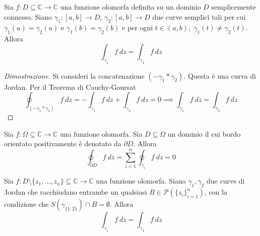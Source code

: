             \begin{corollary}
                Sia $f: D \subseteq \mathbb{C} \rightarrow \mathbb{C}$ una funzione olomorfa definita su un dominio $D$ semplicemente connesso.
                Siano $\gamma_{1}: [a, b] \rightarrow D$, $\gamma_{2}: [a, b] \rightarrow D$ due curve semplici tali per cui $\gamma_{1}(a) = \gamma_{2}(a)$ e $\gamma_{1}(b) = \gamma_{2}(b)$ e per ogni $t \in (a, b), \; \gamma_{1}(t) \neq \gamma_{2}(t)$.
                Allora
                \[
                    \int_{\gamma_{1}} f \: dz = \int_{\gamma_{2}} f \: dz
                \]
            \end{corollary}

            \begin{proof}[Dimostrazione]
                Si consideri la concatenazione $(-\gamma_{1} * \gamma_{2})$.
                Questa è una curva di Jordan.
                Per il Teorema di Cauchy-Goursat
                \[
                    \oint_{(-\gamma_{1} * \gamma_{2})} f \: dz = - \int_{\gamma_{1}} f \: dz + \int_{\gamma_{2}} f \: dz = 0 \implies \int_{\gamma_{1}} f \: dz = \int_{\gamma_{2}} f \: dz
                \]
            \end{proof}

            \begin{theorem}
                Sia $f: \Omega \subseteq \mathbb{C} \rightarrow \mathbb{C}$ una funzione olomorfa.
                Sia $D \subseteq \Omega$ un dominio il cui bordo orientato positivamente è denotato da $\partial D$.
                Allora
                \[
                    \oint_{\partial D} f \: dz = \sum_{i = 1}^{n} \oint_{\gamma_{i}} f \: dz = 0
                \]
            \end{theorem}

            \begin{corollary}
                Sia $f: D \setminus \{z_{1}, ..., z_{n}\} \subseteq \mathbb{C} \rightarrow \mathbb{C}$ una funzione olomorfa.
                Siano $\gamma_{1}, \gamma_{2}$ due curve di Jordan che racchiudano entrambe un qualsiasi $B \in \mathcal{P}(\{z_{i}\}_{i = 1}^{n})$, con la condizione che $S(\gamma_{\{1, 2\}}) \cap B = \emptyset$.
                Allora
                \[
                    \int_{\gamma_{1}} f \: dz = \int_{\gamma_{2}} f \: dz
                \]
            \end{corollary}



